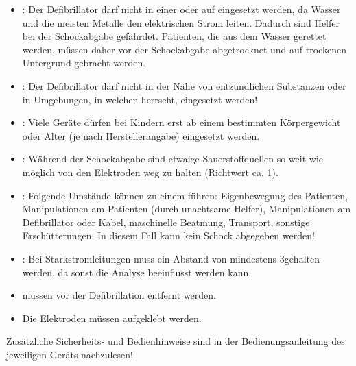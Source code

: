 \begin{BoxRed}[title={\flushleft Sicherheits- und weitere Bedienungshinweise}]
\begin{itemize}
  \item {}: Der Defibrillator darf nicht in einer  oder auf  eingesetzt werden,
  da Wasser und die meisten Metalle den elektrischen Strom
  leiten.
  Dadurch sind Helfer bei der Schockabgabe gefährdet. 
  Patienten, die aus dem Wasser gerettet werden,
  müssen daher vor der Schockabgabe abgetrocknet und auf
  trockenen Untergrund gebracht werden.
  \item {}: Der Defibrillator darf nicht 
  in der Nähe von entzündlichen Substanzen 
  oder in Umgebungen, 
  in welchen  herrscht,
  eingesetzt werden!
  \item {}: Viele Geräte dürfen bei {Kindern} erst ab einem 
  bestimmten Körpergewicht oder Alter (je nach Herstellerangabe)
  eingesetzt werden.
  \item {}: 
  Während der Schockabgabe sind etwaige
  {Sauerstoffquellen} so weit wie möglich von den
  Elektroden weg zu halten (Richtwert ca. 1\Meter*).
  \item {}: Folgende Umstände können zu einem  führen: Eigenbewegung des Patienten,
  Manipulationen am Patienten (durch unachtsame Helfer),
  Manipulationen am Defibrillator oder Kabel, maschinelle
  Beatmung, Transport, sonstige Erschütterungen. In diesem
  Fall kann kein Schock abgegeben werden!
  \item {}: 
  Bei Starkstromleitungen muss ein Abstand von
  mindestens 3\Meter* gehalten werden, 
  da sonst die Analyse beeinflusst werden kann.
  \item {} müssen vor der
  Defibrillation entfernt werden.
  \item Die Elektroden müssen 
  aufgeklebt werden.
\end{itemize}
Zusätzliche Sicherheits- und Bedienhinweise sind in der
Bedienungsanleitung des jeweiligen Geräts nachzulesen!

\begin{center}
\end{center}
\end{BoxRed}

